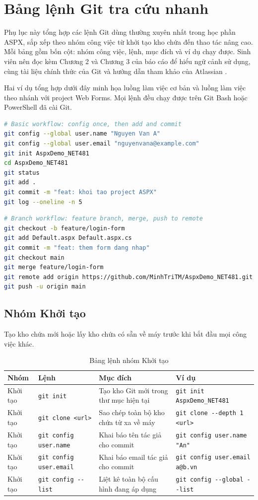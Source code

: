\section{Bảng lệnh Git tra cứu nhanh}
\label{sec:pa-banglenh}

Phụ lục này tổng hợp các lệnh Git dùng thường xuyên nhất trong học phần ASPX,
sắp xếp theo nhóm công việc từ khởi tạo kho chứa đến thao tác nâng cao.
Mỗi bảng gồm bốn cột: nhóm công việc, lệnh, mục đích và ví dụ chạy được.
Sinh viên nên đọc kèm Chương 2 và Chương 3 của báo cáo để hiểu ngữ cảnh sử dụng,
cùng tài liệu chính thức của Git \cite{progit} và hướng dẫn tham khảo của Atlassian \cite{atlassiangit}.

Hai ví dụ tổng hợp dưới đây minh họa luồng làm việc cơ bản và luồng làm việc theo nhánh
với project Web Forms. Mọi lệnh đều chạy được trên Git Bash hoặc PowerShell đã cài Git.

\begin{lstlisting}[language=bash]
# Basic workflow: config once, then add and commit
git config --global user.name "Nguyen Van A"
git config --global user.email "nguyenvana@example.com"
git init AspxDemo_NET481
cd AspxDemo_NET481
git status
git add .
git commit -m "feat: khoi tao project ASPX"
git log --oneline -n 5
\end{lstlisting}

\begin{lstlisting}[language=bash]
# Branch workflow: feature branch, merge, push to remote
git checkout -b feature/login-form
git add Default.aspx Default.aspx.cs
git commit -m "feat: them form dang nhap"
git checkout main
git merge feature/login-form
git remote add origin https://github.com/MinhTriTM/AspxDemo_NET481.git
git push -u origin main
\end{lstlisting}

\subsection{Nhóm Khởi tạo}
Tạo kho chứa mới hoặc lấy kho chứa có sẵn về máy trước khi bắt đầu mọi công việc khác.
\begin{table}[H]
\centering
\small
\begin{tabular}{p{1.7cm} p{3.2cm} p{4.5cm} p{4.6cm}}
\toprule
Nhóm & Lệnh & Mục đích & Ví dụ \\
\midrule
Khởi tạo & \verb|git init| & Tạo kho Git mới trong thư mục hiện tại & \verb|git init AspxDemo_NET481| \\
Khởi tạo & \verb|git clone <url>| & Sao chép toàn bộ kho chứa từ xa về máy & \verb|git clone --depth 1 <url>| \\
Khởi tạo & \verb|git config user.name| & Khai báo tên tác giả cho commit & \verb|git config user.name "An"| \\
Khởi tạo & \verb|git config user.email| & Khai báo email tác giả cho commit & \verb|git config user.email a@b.vn| \\
Khởi tạo & \verb|git config --list| & Liệt kê toàn bộ cấu hình đang áp dụng & \verb|git config --global --list| \\
\bottomrule
\end{tabular}
\caption{Bảng lệnh nhóm Khởi tạo}
\label{tab:pa-khoitao}
\end{table}

